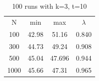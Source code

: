 \documentclass{article}
\begin{document}
		\begin{table}[h!]
		  \begin{center}
		    \caption{100 runs with k=3, t=10}
		    \label{tab:table1}
		    \begin{tabular}{|c|c|c|c|} 
		      \hline
		      N & min & max & $\lambda$\\
		      100  & 42.98 & 51.16 & 0.840\\
		      300  & 44.73 & 49.24 & 0.908\\
		      500  & 45.04 & 47.696 & 0.944\\
		      1000 & 45.66 & 47.31 & 0.965\\
		      \hline
		    \end{tabular}
		  \end{center}
		\end{table}
\end{document}
